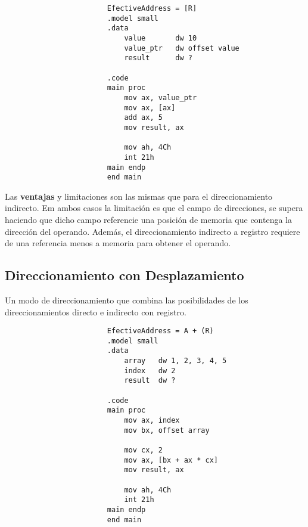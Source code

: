 \documentclass{article}
\begin{document}
\begin{verbatim}
                        EfectiveAddress = [R]
                        .model small
                        .data
                            value       dw 10
                            value_ptr   dw offset value
                            result      dw ?

                        .code
                        main proc
                            mov ax, value_ptr
                            mov ax, [ax]
                            add ax, 5
                            mov result, ax

                            mov ah, 4Ch
                            int 21h
                        main endp
                        end main
\end{verbatim}

Las \textbf{ventajas} y limitaciones son las mismas que para el direccionamiento
indirecto. Em ambos casos la limitaci\'{o}n es que el campo de direcciones,
se supera haciendo que dicho campo referencie una posici\'{o}n de memoria
que contenga la direcci\'{o}n del operando. Adem\'{a}s, el direccionamiento
indirecto a registro requiere de una referencia menos a memoria para
obtener el operando.

\subsection*{Direccionamiento con Desplazamiento}
Un modo de direccionamiento que combina las posibilidades de los direccionamientos
directo e indirecto con registro.
\begin{verbatim}
                        EfectiveAddress = A + (R)
                        .model small
                        .data
                            array   dw 1, 2, 3, 4, 5
                            index   dw 2
                            result  dw ?

                        .code
                        main proc
                            mov ax, index
                            mov bx, offset array

                            mov cx, 2
                            mov ax, [bx + ax * cx]
                            mov result, ax

                            mov ah, 4Ch
                            int 21h
                        main endp
                        end main
    
\end{verbatim}
\end{document}
